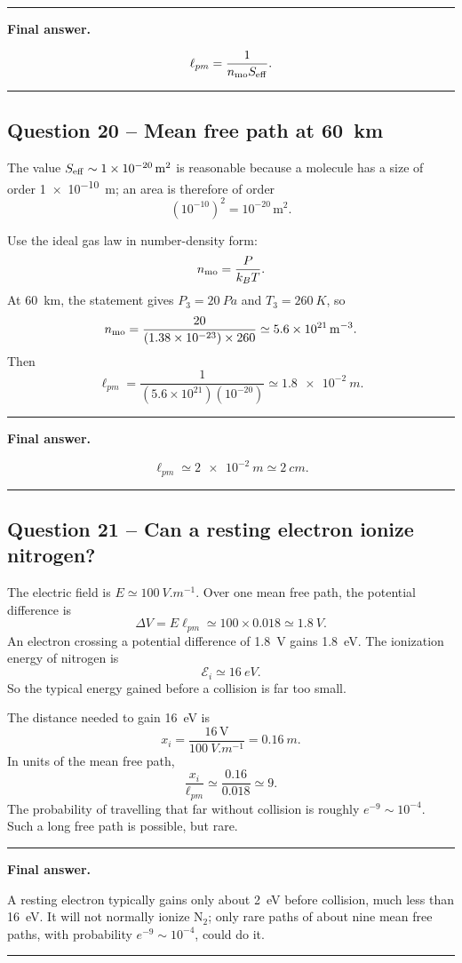 \documentclass[11pt,a4paper]{article}
\newenvironment{finalanswer}{%
  \begin{center}\begin{minipage}{0.94\linewidth}\hrule\vspace{0.45em}\textbf{Final answer. }%
}{%
  \vspace{0.45em}\hrule\end{minipage}\end{center}%
}
\newcommand{\Ntwo}{\ensuremath{\mathrm{N}_2}}
\begin{document}
\begin{finalanswer}
\[
\ell_{pm}=\frac{1}{n_{\rm mo}S_{\rm eff}}.
\]
\end{finalanswer}

\subsection*{Question 20 -- Mean free path at \SI{60}{km}}

The value $S_{\rm eff}\sim\SI{1e-20}{m^2}$ is reasonable because a molecule has a size of order \SI{1e-10}{m}; an area is therefore of order
\[
 (10^{-10})^2=10^{-20}\,\mathrm{m^2}.
\]

Use the ideal gas law in number-density form:
\[
 n_{\rm mo}=\frac{P}{k_BT}.
\]
At \SI{60}{km}, the statement gives $P_3=\SI{20}{Pa}$ and $T_3=\SI{260}{K}$, so
\[
 n_{\rm mo}=\frac{20}{(1.38\times10^{-23})\times260}
 \simeq\SI{5.6e21}{m^{-3}}.
\]
Then
\[
 \ell_{pm}=\frac{1}{(5.6\times10^{21})(10^{-20})}
 \simeq\SI{1.8e-2}{m}.
\]

\begin{finalanswer}
\[
\ell_{pm}\simeq\SI{2e-2}{m}\simeq\SI{2}{cm}.
\]
\end{finalanswer}

\subsection*{Question 21 -- Can a resting electron ionize nitrogen?}

The electric field is $E\simeq\SI{100}{V.m^{-1}}$. Over one mean free path, the potential difference is
\[
 \Delta V=E\ell_{pm}\simeq 100\times0.018\simeq\SI{1.8}{V}.
\]
An electron crossing a potential difference of \SI{1.8}{V} gains \SI{1.8}{eV}. The ionization energy of nitrogen is
\[
 \mathcal{E}_i\simeq\SI{16}{eV}.
\]
So the typical energy gained before a collision is far too small.

The distance needed to gain \SI{16}{eV} is
\[
 x_i=\frac{16\,\mathrm{V}}{\SI{100}{V.m^{-1}}}=\SI{0.16}{m}.
\]
In units of the mean free path,
\[
 \frac{x_i}{\ell_{pm}}\simeq\frac{0.16}{0.018}\simeq 9.
\]
The probability of travelling that far without collision is roughly $e^{-9}\sim10^{-4}$. Such a long free path is possible, but rare.

\begin{finalanswer}
A resting electron typically gains only about \SI{2}{eV} before collision, much less than \SI{16}{eV}. It will not normally ionize \Ntwo; only rare paths of about nine mean free paths, with probability $e^{-9}\sim10^{-4}$, could do it.
\end{finalanswer}
\end{document}
